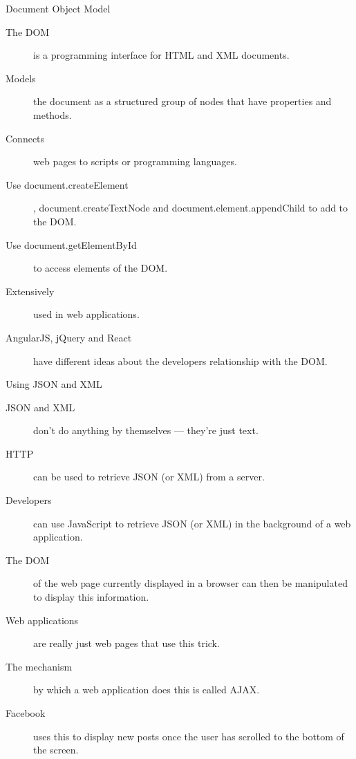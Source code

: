 \begin{frame}{Document Object Model}
  \begin{description}
    \item[The DOM] is a programming interface for HTML and XML documents.
    \item[Models] the document as a structured group of nodes that have properties and methods.
    \item[Connects] web pages to scripts or programming languages.
    \item[Use document.createElement], document.createTextNode and document.element.appendChild to add to the DOM.
    \item[Use document.getElementById] to access elements of the DOM.
    \item[Extensively] used in web applications.
    \item[AngularJS, jQuery and React] have different ideas about the developers relationship with the DOM.
  \end{description}
\end{frame}


\begin{frame}{Using JSON and XML}
  \begin{description}
    \item[JSON and XML] don't do anything by themselves --- they're just text.
    \item[HTTP] can be used to retrieve JSON (or XML) from a server.
    \item[Developers] can use JavaScript to retrieve JSON (or XML) in the background of a web application.
    \item[The DOM] of the web page currently displayed in a browser can then be manipulated to display this information.
    \item[Web applications] are really just web pages that use this trick.
    \item[The mechanism] by which a web application does this is called AJAX.
    \item[Facebook] uses this to display new posts once the user has scrolled to the bottom of the screen.
  \end{description}
\end{frame}


